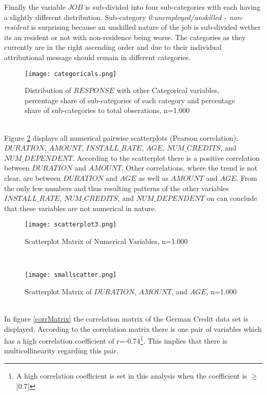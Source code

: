 Finally the variable $JOB$ is sub-divided into four sub-categories with each having a slightly different distribution. Sub-category \textit{0:unemployed/unskilled - non-resident} is surprising because an unskilled nature of the job is sub-divided wether its an resident or not with non-residence being worse. The categories as they currently are in the right ascending order and due to their individual attributional message should remain in different categories. 
\begin{figure}[htbp]
	\centering
	\texttt{[image: categoricals.png]}
	\caption{Distribution of $RESPONSE$ with other Categorical variables, percentage share of sub-categories of each category and percentage share of sub-categories to total obserations, n=1.000}
	\label{categoricals}
\end{figure}\\
Figure \ref{scatterplot} displays all numerical pairwise scatterplots (Pearson correlation): $DURATION$, $AMOUNT$, $INSTALL\_RATE$, $AGE$, $NUM\_CREDITS$, and $NUM\_DEPENDENT$. According to the scatterplot there is a positive correlation between $DURATION$ and $AMOUNT$. Other correlations, where the trend is not clear, are between $DURATION$ and $AGE$ as well as $AMOUNT$ and $AGE$. From the only few numbers and thus resulting patterns of the other variables $INSTALL\_RATE$, $NUM\_CREDITS$, and $NUM\_DEPENDENT$ on can conclude that these variables are not numerical in nature. %
\begin{figure}[htbp!]
	\centering
	\texttt{[image: scatterplot3.png]}
	\caption{Scatterplot Matrix of Numerical Variables, n=1.000}
	\label{scatterplot}
\end{figure}\\
\begin{figure}[htbp!]
	\centering
	\texttt{[image: smallscatter.png]}
	\caption{Scatterplot Matrix of $DURATION$, $AMOUNT$, and $AGE$, n=1.000}
	\label{scatterplot2}
\end{figure}\\
In figure \ref{corrMatrix} the correlation matrix of the German Credit data set is displayed. According to the correlation matrix there is one pair of variables which has a high correlation coefficient of r=-0.74\footnote{A high correlation coefficient is set in this analysis when the coefficient is $\geq$ |0.7|}. This implies that there is multicollinearity regarding this pair.
